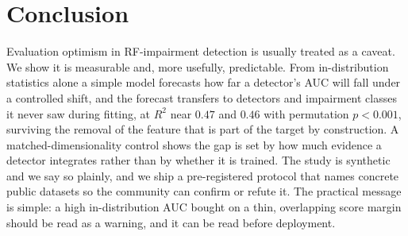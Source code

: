 \documentclass[conference]{IEEEtran}
\begin{document}
\section{Conclusion}
Evaluation optimism in RF-impairment detection is usually treated as a caveat. We
show it is measurable and, more usefully, predictable. From in-distribution
statistics alone a simple model forecasts how far a detector's AUC will fall under a
controlled shift, and the forecast transfers to detectors and impairment classes it
never saw during fitting, at $R^2$ near $0.47$ and $0.46$ with permutation
$p<0.001$, surviving the removal of the feature that is part of the target by
construction. A matched-dimensionality control shows the gap is set by how much
evidence a detector integrates rather than by whether it is trained. The study is
synthetic and we say so plainly, and we ship a pre-registered protocol that names
concrete public datasets so the community can confirm or refute it. The practical
message is simple: a high in-distribution AUC bought on a thin, overlapping score
margin should be read as a warning, and it can be read before deployment.
\end{document}

